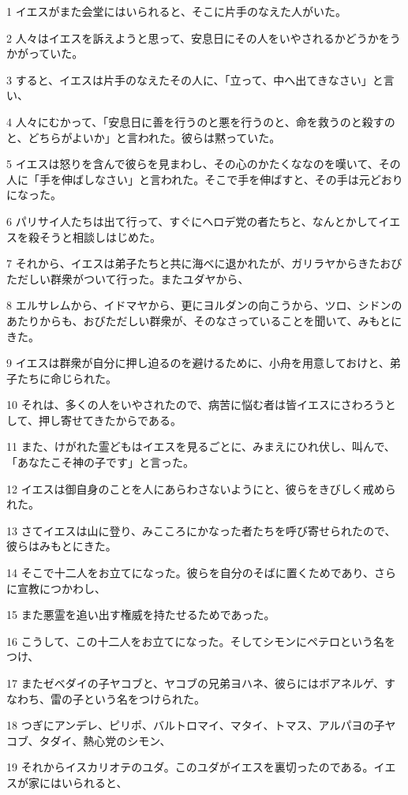 \par 1 イエスがまた会堂にはいられると、そこに片手のなえた人がいた。
\par 2 人々はイエスを訴えようと思って、安息日にその人をいやされるかどうかをうかがっていた。
\par 3 すると、イエスは片手のなえたその人に、「立って、中へ出てきなさい」と言い、
\par 4 人々にむかって、「安息日に善を行うのと悪を行うのと、命を救うのと殺すのと、どちらがよいか」と言われた。彼らは黙っていた。
\par 5 イエスは怒りを含んで彼らを見まわし、その心のかたくななのを嘆いて、その人に「手を伸ばしなさい」と言われた。そこで手を伸ばすと、その手は元どおりになった。
\par 6 パリサイ人たちは出て行って、すぐにヘロデ党の者たちと、なんとかしてイエスを殺そうと相談しはじめた。
\par 7 それから、イエスは弟子たちと共に海べに退かれたが、ガリラヤからきたおびただしい群衆がついて行った。またユダヤから、
\par 8 エルサレムから、イドマヤから、更にヨルダンの向こうから、ツロ、シドンのあたりからも、おびただしい群衆が、そのなさっていることを聞いて、みもとにきた。
\par 9 イエスは群衆が自分に押し迫るのを避けるために、小舟を用意しておけと、弟子たちに命じられた。
\par 10 それは、多くの人をいやされたので、病苦に悩む者は皆イエスにさわろうとして、押し寄せてきたからである。
\par 11 また、けがれた霊どもはイエスを見るごとに、みまえにひれ伏し、叫んで、「あなたこそ神の子です」と言った。
\par 12 イエスは御自身のことを人にあらわさないようにと、彼らをきびしく戒められた。
\par 13 さてイエスは山に登り、みこころにかなった者たちを呼び寄せられたので、彼らはみもとにきた。
\par 14 そこで十二人をお立てになった。彼らを自分のそばに置くためであり、さらに宣教につかわし、
\par 15 また悪霊を追い出す権威を持たせるためであった。
\par 16 こうして、この十二人をお立てになった。そしてシモンにペテロという名をつけ、
\par 17 またゼベダイの子ヤコブと、ヤコブの兄弟ヨハネ、彼らにはボアネルゲ、すなわち、雷の子という名をつけられた。
\par 18 つぎにアンデレ、ピリポ、バルトロマイ、マタイ、トマス、アルパヨの子ヤコブ、タダイ、熱心党のシモン、
\par 19 それからイスカリオテのユダ。このユダがイエスを裏切ったのである。イエスが家にはいられると、

